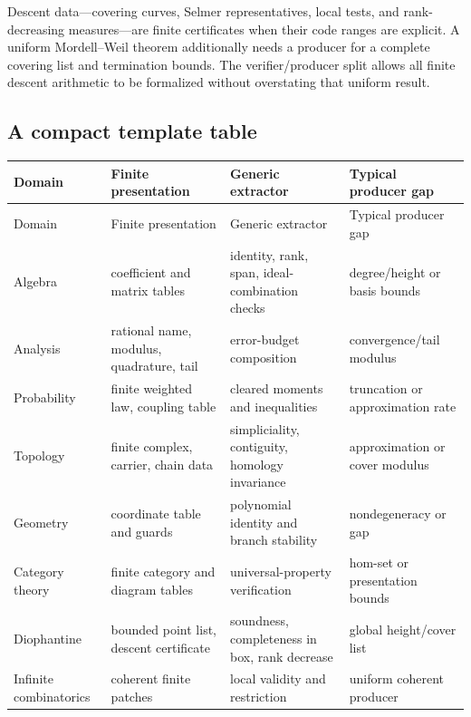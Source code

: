 Descent data---covering curves, Selmer representatives, local tests, and
rank-decreasing measures---are finite certificates when their code ranges are
explicit.  A uniform Mordell--Weil theorem additionally needs a producer for a
complete covering list and termination bounds.  The verifier/producer split
allows all finite descent arithmetic to be formalized without overstating that
uniform result.

\subsection{A compact template table}

\begin{longtable}{@{}p{}p{}p{}p{}@{}}
\toprule
Domain & Finite presentation & Generic extractor & Typical producer gap \\
\midrule
\endfirsthead
\toprule
Domain & Finite presentation & Generic extractor & Typical producer gap \\
\midrule
\endhead
Algebra & coefficient and matrix tables & identity, rank, span, ideal-combination checks & degree/height or basis bounds \\
Analysis & rational name, modulus, quadrature, tail & error-budget composition & convergence/tail modulus \\
Probability & finite weighted law, coupling table & cleared moments and inequalities & truncation or approximation rate \\
Topology & finite complex, carrier, chain data & simpliciality, contiguity, homology invariance & approximation or cover modulus \\
Geometry & coordinate table and guards & polynomial identity and branch stability & nondegeneracy or gap \\
Category theory & finite category and diagram tables & universal-property verification & hom-set or presentation bounds \\
Diophantine & bounded point list, descent certificate & soundness, completeness in box, rank decrease & global height/cover list \\
Infinite combinatorics & coherent finite patches & local validity and restriction & uniform coherent producer \\
\bottomrule
\end{longtable}
